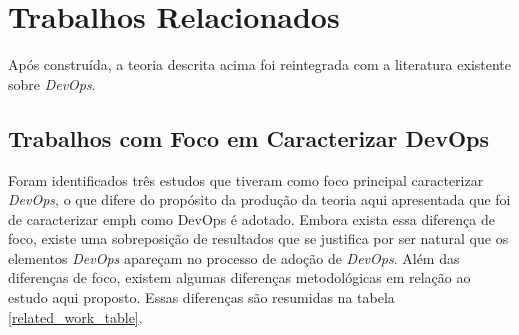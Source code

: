 \section{Trabalhos Relacionados}

Após construída, a teoria descrita acima foi reintegrada com a literatura
existente sobre {\it DevOps}.






\subsection{Trabalhos com Foco em Caracterizar DevOps}\label{secao_caracterizacoes_devops}

Foram identificados três estudos que tiveram como foco principal
caracterizar {\it DevOps}, o que difere do propósito da produção
da teoria aqui apresentada que foi de caracterizar {emph como DevOps é adotado}.
Embora exista essa diferença de foco, existe uma sobreposição de resultados que se
justifica por ser natural que os elementos {\it DevOps} apareçam no processo de
adoção de {\it DevOps}. Além das diferenças de foco, existem algumas
diferenças metodológicas em relação ao estudo aqui proposto. Essas diferenças
são resumidas na tabela \ref{related_work_table}.

